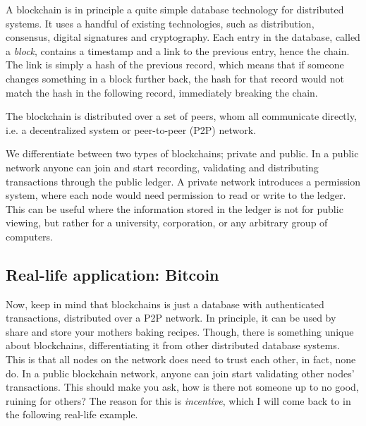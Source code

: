 


A blockchain is in principle a quite simple database technology for
distributed systems. It uses a handful of existing technologies, such
as distribution, consensus, digital signatures and cryptography.  Each
entry in the database, called a \textit{block}, contains a timestamp
and a link to the previous entry, hence the chain. The link is simply a
hash of the previous record, which means that if someone changes
something in a block further back, the hash for that record would not
match the hash in the following record, immediately breaking the
chain.

The blockchain is distributed over a set of peers, whom all communicate
directly, i.e. a decentralized system or peer-to-peer (P2P) network.


We differentiate between two types of blockchains; private and
public. In a public network anyone can join and start recording,
validating and distributing transactions through the public
ledger. A private network introduces a permission system, where each
node would need permission to read or write to the ledger. This can be
useful where the information stored in the ledger is not for public
viewing, but rather for a university, corporation, or any arbitrary
group of computers.


\subsection{Real-life application: Bitcoin}
Now, keep in mind that blockchains is just a database with
authenticated transactions, distributed over a P2P network. In
principle, it can be used by share and store your mothers baking
recipes. Though, there is something unique about blockchains,
differentiating it from other distributed database systems. This is
that all nodes on the network does need to trust each other, in fact,
none do. In a public blockchain network, anyone can join start
validating other nodes' transactions. This should make you ask, how is
there not someone up to no good, ruining for others? The reason for
this is \textit{incentive}, which I will come back to in the following
real-life example.

